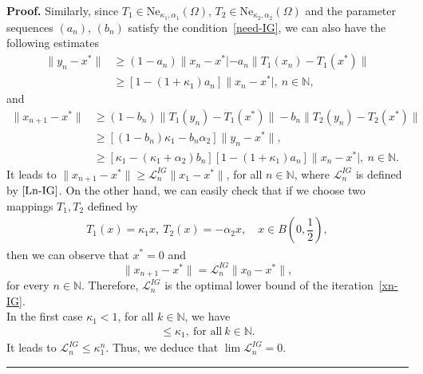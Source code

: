 \documentclass[a4paper, 11pt]{article}
\newenvironment{proof}[1][Proof]{\textbf{#1.} }{\hfill\rule{0.5em}{0.5em}}
\begin{document}
		\begin{proof}
			Similarly, since $T_1 \in \text{Ne}_{\kappa_1, \alpha_1}(\Omega)$, $T_2 \in \text{Ne}_{\kappa_2, \alpha_2}(\Omega)$ and the parameter sequences $(a_n)$, $(b_n)$ satisfy the condition~\eqref{need-IG}, we can also have the following estimates
			\begin{align*}
				\| y_n - x^* \| &\ge (1 - a_n)\|x_n - x^*| - a_n\|T_1(x_n) - T_1(x^*)\| \\
				&\ge [1 - (1 + \kappa_1)a_n]\|x_n - x^*|, ~ n \in \mathbb{N},
			\end{align*}
			and
			\begin{align*} 
				\|x_{n+1}-x^*\| &\ge (1 - b_n)\|T_1(y_n) - T_1(x^*)\| - b_n\|T_2(y_n) - T_2(x^*)\| \\ &\ge [(1 - b_n)\kappa_1-b_n\alpha_2]\|y_n-x^*\|, \\
				&\ge [\kappa_1 - (\kappa_1 + \alpha_2)b_n][1 - (1 + \kappa_1)a_n]\|x_n - x^*|, ~ n \in \mathbb{N}.
			\end{align*}
			It leads to $\|x_{n+1}-x^*\| \ge \mathcal{L}_n^{IG}\|x_1-x^*\|$, for all $n \in \mathbb{N}$,
			where $\mathcal{L}_n^{IG}$ is defined by $\eqref{Ln-IG}$. 	On the other hand, we can easily check that if we choose two mappings $T_1,T_2$ defined by
			\begin{align*}
				T_1(x)= \kappa_1 x, \ T_2(x)=-\alpha_2 x, \quad x \in B\left(0, \dfrac{1}{2}\right),
			\end{align*}
			then we can observe that $x^*=0$ and 
			$$\|x_{n+1}-x^*\|=\mathcal{L}_n^{IG}\|x_0-x^*\|,$$
			for every $n \in \mathbb{N}$. Therefore, $\mathcal{L}_n^{IG}$ is the optimal lower bound of the iteration~\eqref{xn-IG}. \\
			
			In the first case $\kappa_1<1$, for all $k \in \mathbb{N}$, we have
			\begin{align*}
				[\kappa_1 - (\kappa_1 + \alpha_2)b_k][1 - (1 + \kappa_1)a_k] \le \kappa_1,~ \text{for all} ~k \in \mathbb{N}.
			\end{align*}
			It leads to $\mathcal{L}_n^{IG}\le \kappa_1^n$. Thus, we deduce that $\lim{\mathcal{L}_n^{IG}}=0$. \\
			

\end{proof}
\end{document}
